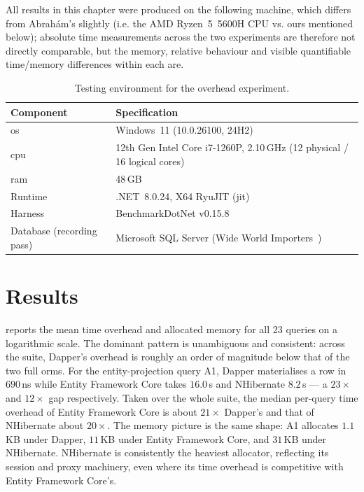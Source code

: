 All results in this chapter were produced on the following machine, which differs from Abrahám's slightly (i.e. the AMD Ryzen~5~5600H CPU vs. ours mentioned below); absolute time measurements across the two experiments are therefore not directly comparable, but the memory, relative behaviour and visible quantifiable time/memory differences within each are.

\begin{table}[H]
\centering
\caption{Testing environment for the overhead experiment.}
\label{tab:overhead-env}
\begin{tabularx}{\columnwidth}{@{}lX@{}}
\toprule
Component & Specification \\
\midrule
\acrshort{os} & Windows~11 (10.0.26100, 24H2) \\
\acrshort{cpu} & 12th Gen Intel Core i7-1260P, 2.10\,GHz (12 physical / 16 logical cores) \\
\acrshort{ram} & 48\,GB \\
Runtime & .NET~8.0.24, X64 RyuJIT (\acrshort{jit}) \\
Harness & BenchmarkDotNet v0.15.8 \\
Database (recording pass) & Microsoft SQL Server (Wide World Importers~\cite{wideWorldImporters}) \\
\bottomrule
\end{tabularx}
\end{table}

\section{Results}
\label{sec:overhead-results}

 reports the mean time overhead and allocated memory for all 23 queries on a logarithmic scale. The dominant pattern is unambiguous and consistent: across the suite, Dapper's overhead is roughly an order of magnitude below that of the two full \acrshort{orm}s. For the entity-projection query A1, Dapper materialises a row in $690$\,ns while Entity Framework Core takes $16.0$\,\textmu s and NHibernate $8.2$\,\textmu s --- a $23\times$ and $12\times$ gap respectively. Taken over the whole suite, the median per-query time overhead of Entity Framework Core is about $21\times$ Dapper's and that of NHibernate about $20\times$. The memory picture is the same shape: A1 allocates $1.1$\,KB under Dapper, $11$\,KB under Entity Framework Core, and $31$\,KB under NHibernate. NHibernate is consistently the heaviest allocator, reflecting its session and proxy machinery, even where its time overhead is competitive with Entity Framework Core's.

